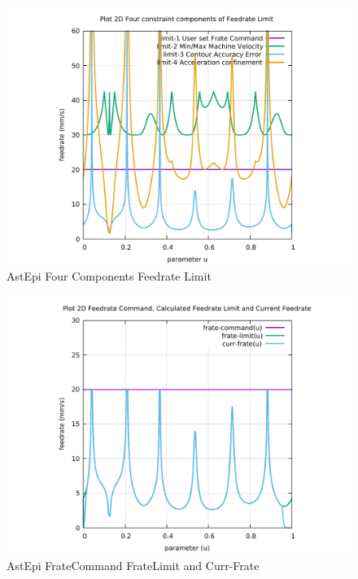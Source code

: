 \begin{figure}
	\caption     {AstEpi Four Components Feedrate Limit}
	\label{10-img-AstEpi-Four-Components-Feedrate-Limit.pdf}
\includegraphics[width=1.00\textwidth]{Chap4/appendix/app-AstEpi/plots/10-img-AstEpi-Four-Components-Feedrate-Limit.pdf}
\end{figure}

\clearpage
\pagebreak

\begin{figure}
	\caption     {AstEpi FrateCommand FrateLimit and Curr-Frate}
	\label{11-img-AstEpi-FrateCommand-FrateLimit-and-Curr-Frate.pdf}
\includegraphics[width=1.00\textwidth]{Chap4/appendix/app-AstEpi/plots/11-img-AstEpi-FrateCommand-FrateLimit-and-Curr-Frate.pdf}
\end{figure}

